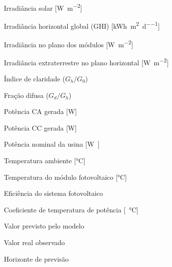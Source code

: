 \begin{listofsymbols}
\item[$G$]          Irradiância solar [\si{\watt\per\square\meter}]
\item[$G_h$]        Irradiância horizontal global (GHI) [\si{\kWh\per\square\metre\per\day}]
\item[$G_t$]        Irradiância no plano dos módulos [\si{\watt\per\square\meter}]
\item[$G_0$]        Irradiância extraterrestre no plano horizontal [\si{\watt\per\square\meter}]
\item[$k_t$]        Índice de claridade ($G_h / G_0$)
\item[$k_d$]        Fração difusa ($G_d / G_h$)
\item[$P_{ac}$]     Potência CA gerada [\si{\watt}]
\item[$P_{dc}$]     Potência CC gerada [\si{\watt}]
\item[$P_{\mathrm{nom}}$] Potência nominal da usina [\si{\watt\peak}]
\item[$T_{amb}$]    Temperatura ambiente [\si{\celsius}]
\item[$T_{mod}$]    Temperatura do módulo fotovoltaico [\si{\celsius}]
\item[$\eta$]       Eficiência do sistema fotovoltaico
\item[$\gamma$]     Coeficiente de temperatura de potência [\si{\per\celsius}]
\item[$\hat{y}$]    Valor previsto pelo modelo
\item[$y$]          Valor real observado
\item[$h$]          Horizonte de previsão
\end{listofsymbols}
